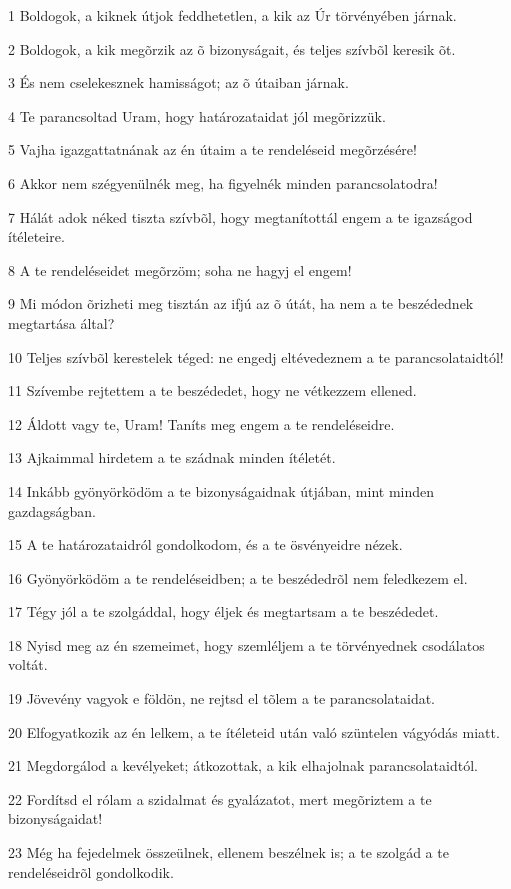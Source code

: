 \par 1 Boldogok, a kiknek útjok feddhetetlen, a kik az Úr törvényében járnak.
\par 2 Boldogok, a kik megõrzik az õ bizonyságait, és teljes szívbõl keresik õt.
\par 3 És nem cselekesznek hamisságot; az õ útaiban járnak.
\par 4 Te parancsoltad Uram, hogy határozataidat jól megõrizzük.
\par 5 Vajha igazgattatnának az én útaim a te rendeléseid megõrzésére!
\par 6 Akkor nem szégyenülnék meg, ha figyelnék minden parancsolatodra!
\par 7 Hálát adok néked tiszta szívbõl, hogy megtanítottál engem a te igazságod ítéleteire.
\par 8 A te rendeléseidet megõrzöm; soha ne hagyj el engem!
\par 9 Mi módon õrizheti meg tisztán az ifjú az õ útát, ha nem a te beszédednek megtartása által?
\par 10 Teljes szívbõl kerestelek téged: ne engedj eltévedeznem a te parancsolataidtól!
\par 11 Szívembe rejtettem a te beszédedet, hogy ne vétkezzem ellened.
\par 12 Áldott vagy te, Uram! Taníts meg engem a te rendeléseidre.
\par 13 Ajkaimmal hirdetem a te szádnak minden ítéletét.
\par 14 Inkább gyönyörködöm a te bizonyságaidnak útjában, mint minden gazdagságban.
\par 15 A te határozataidról gondolkodom, és a te ösvényeidre nézek.
\par 16 Gyönyörködöm a te rendeléseidben; a te beszédedrõl nem feledkezem el.
\par 17 Tégy jól a te szolgáddal, hogy éljek és megtartsam a te beszédedet.
\par 18 Nyisd meg az én szemeimet, hogy szemléljem a te törvényednek csodálatos voltát.
\par 19 Jövevény vagyok e földön, ne rejtsd el tõlem a te parancsolataidat.
\par 20 Elfogyatkozik az én lelkem, a te ítéleteid után való szüntelen vágyódás miatt.
\par 21 Megdorgálod a kevélyeket; átkozottak, a kik elhajolnak parancsolataidtól.
\par 22 Fordítsd el rólam a szidalmat és gyalázatot, mert megõriztem a te bizonyságaidat!
\par 23 Még ha fejedelmek összeülnek, ellenem beszélnek is; a te szolgád a te rendeléseidrõl gondolkodik.
